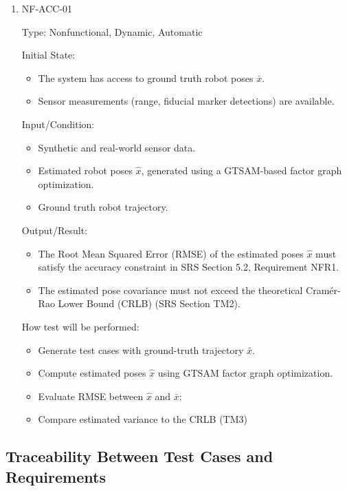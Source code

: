 \documentclass[12pt, titlepage]{article}
\begin{document}
\begin{enumerate}

\item{NF-ACC-01\\}

Type: Nonfunctional, Dynamic, Automatic
					
Initial State: 
\begin{itemize}
  \item The system has access to ground truth robot poses $\bar{x}$.
  \item Sensor measurements (range, fiducial marker detections) are available.
\end{itemize}
					
Input/Condition: 
\begin{itemize}
  \item Synthetic and real-world sensor data.
  \item Estimated robot poses $\hat{x}$, generated using a GTSAM-based factor graph optimization.
  \item Ground truth robot trajectory.
\end{itemize}
					
Output/Result: 
\begin{itemize}
  \item The Root Mean Squared Error (RMSE) of the estimated poses $\hat{x}$ must satisfy the accuracy constraint in SRS Section 5.2, Requirement NFR1.
  \item The estimated pose covariance must not exceed the theoretical Cram\'er-Rao Lower Bound (CRLB) (SRS Section TM2).
\end{itemize}
					
How test will be performed: 
\begin{itemize}
  \item Generate test cases with ground-truth trajectory $\bar{x}$.
  \item Compute estimated poses $\hat{x}$ using GTSAM factor graph optimization.
  \item Evaluate RMSE between $\hat{x}$ and $\bar{x}$:
  \item Compare estimated variance to the CRLB (TM3)
\end{itemize}

\end{enumerate}

\newpage
\subsection{Traceability Between Test Cases and Requirements}
\end{document}
